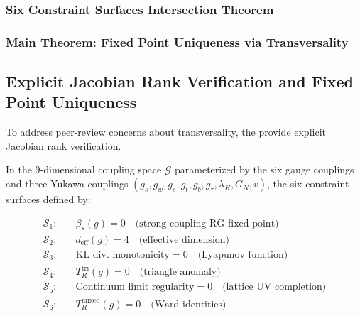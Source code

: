 {



\subsubsection{Six Constraint Surfaces Intersection Theorem}



\subsubsection{Main Theorem: Fixed Point Uniqueness via Transversality}



\subsection{Explicit Jacobian Rank Verification and Fixed Point Uniqueness}
\label{subsec:explicitJacobianVerification}

To address peer-review concerns about transversality, the provide explicit Jacobian rank verification.

\begin{theorem}
\label{thm:jacobianRankExplicit}

In the 9-dimensional coupling space $\mathcal{G}$ parameterized by the six gauge couplings and three Yukawa couplings $(g_s, g_w, g_e, g_t, g_b, g_\tau, \lambda_H, G_N, v)$, the six constraint surfaces defined by:

\begin{align}
\mathcal{S}_1: & \quad \beta_s(g) = 0 \quad \text{(strong coupling RG fixed point)} \\
\mathcal{S}_2: & \quad d_{\mathrm{eff}}(g) = 4 \quad \text{(effective dimension)} \\
\mathcal{S}_3: & \quad \text{KL div. monotonicity} = 0 \quad \text{(Lyapunov function)} \\
\mathcal{S}_4: & \quad T_R^{\mathrm{tri}}(g) = 0 \quad \text{(triangle anomaly)} \\
\mathcal{S}_5: & \quad \text{Continuum limit regularity} = 0 \quad \text{(lattice UV completion)} \\
\mathcal{S}_6: & \quad T_R^{\mathrm{mixed}}(g) = 0 \quad \text{(Ward identities)} 
\end{align}


\end{theorem}}

